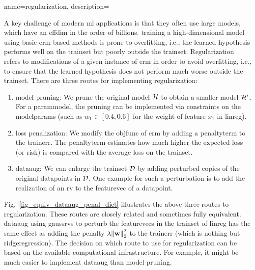 {name={regularization}, 
	description={A key challenge of modern \gls{ml} applications is that they often 
		use large \glspl{model}, which have an \gls{effdim} in the order of billions. 
		\Gls{training} a high-dimensional \gls{model} using basic \gls{erm}-based methods
		is prone to \gls{overfitting}, i.e., the learned \gls{hypothesis} performs well on the \gls{trainset} 
		but poorly outside the \gls{trainset}. Regularization refers to modifications of a given instance 
		of \gls{erm} in order to avoid \gls{overfitting}, i.e., to ensure that the learned \gls{hypothesis} does 
		not perform much worse outside the \gls{trainset}. There are three routes for implementing 
		regularization: 
		\begin{enumerate}[label=\arabic*)]
			\item {\Gls{model} pruning:} We prune the original \gls{model} $\mathcal{H}$ to obtain a 
			smaller \gls{model} $\mathcal{H}'$. For a \gls{parammodel}, the pruning can be 
			implemented via constraints on the \glspl{modelparam} (such as $w_{1} \in [0.4,0.6]$ for 
			the \gls{weight} of \gls{feature} $x_{1}$ in \gls{linreg}).
			\item {\Gls{loss} penalization:} We modify the \gls{objfunc} of \gls{erm} by adding a 
			\gls{penaltyterm} to the \gls{trainerr}. The \gls{penaltyterm} estimates how much higher the 
			expected \gls{loss} (or \gls{risk}) is compared with the average \gls{loss} on the \gls{trainset}. 
			\item {\Gls{dataaug}:} We can enlarge the \gls{trainset} $\mathcal{D}$ by adding 
			perturbed copies of the original \glspl{datapoint} in $\mathcal{D}$. One example for such 
			a perturbation is to add the \gls{realization} of an \gls{rv} to the \gls{featurevec} 
			of a \gls{datapoint}. 
		\end{enumerate} 
		Fig.\ \ref{fig_equiv_dataaug_penal_dict} illustrates the above three routes to regularization. 
		These routes are closely related and sometimes fully equivalent. \Gls{dataaug} using \glspl{gaussrv} 
		to perturb the \glspl{featurevec} in the \gls{trainset} of \gls{linreg} 
		has the same effect as adding the penalty 
		$\lambda \normgeneric{\weights}{2}^2$ to the \gls{trainerr} (which is nothing but \gls{ridgeregression}). 
        		The decision on which route to use for regularization can be based on the 
        		available computational infrastructure. For example, it might be much easier to 
        		implement \gls{dataaug} than \gls{model} pruning. 
		\begin{figure}[H]

\end{figure}}}
